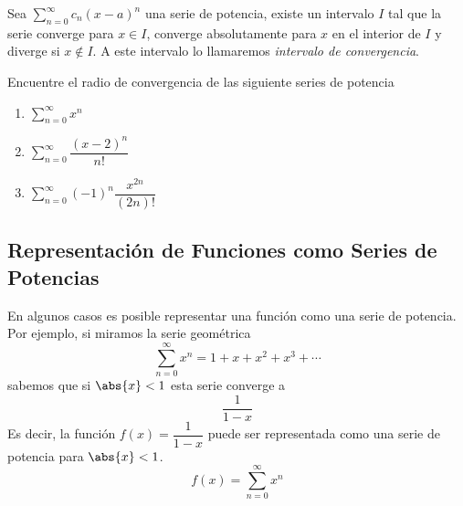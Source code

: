 \begin{frame}
  \begin{cor}
    Sea $\sum_{n=0}^\infty c_n(x-a)^n$ una serie de potencia, existe un intervalo $I$ tal que la serie converge para $x\in I$, converge absolutamente para $x$ en el interior de $I$ y diverge si $x\notin I$. A este intervalo lo llamaremos \emph{intervalo de convergencia}.
  \end{cor}
\end{frame}

\begin{frame}
  \begin{egs}
    Encuentre el radio de convergencia de las siguiente series de potencia\\[0.5cm]
    \begin{enumerate}[<+->]
      \item $\displaystyle\sum_{n=0}^{\infty} x^n$\\[0.25cm]
      \item $\displaystyle\sum_{n=0}^{\infty} \dfrac{(x-2)^n}{n!}$\\[0.25cm]
      \item $\displaystyle\sum_{n=0}^{\infty} (-1)^n\dfrac{x^{2n}}{(2n)!}$\\[0.25cm]
    \end{enumerate}
  \end{egs}
\end{frame}

\subsection{Representación de Funciones como Series de Potencias}
\begin{frame}
\subsectionpage
\end{frame}


\begin{frame}
  En algunos casos es posible representar una función como una serie de potencia.\\[0.25cm]
  Por ejemplo, si miramos la serie geométrica
  $$\sum_{n=0}^{\infty} x^n=1+x+x^2+x^3+\cdots$$
  sabemos que si $\abs{x}<1$ esta serie converge a
  $$\dfrac{1}{1-x}$$
  Es decir, la función $f(x)=\dfrac{1}{1-x}$ puede ser representada como una serie de potencia para $\abs{x}<1$.
  $$f(x)=\sum_{n=0}^{\infty} x^n$$
\end{frame}

